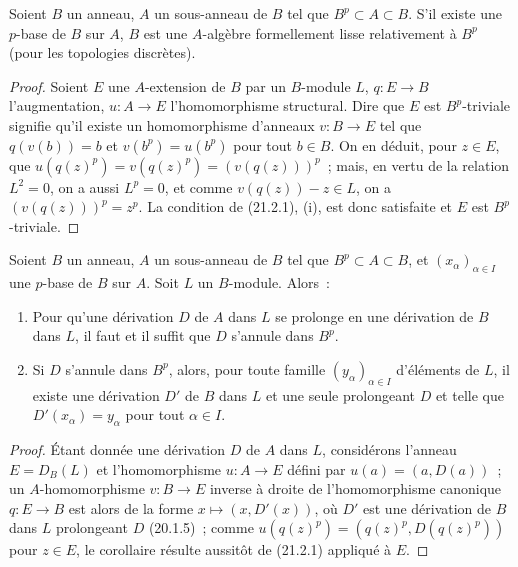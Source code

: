 \begin{corollary}[21.2.2]
\label{0.21.2.2-fr}
Soient $B$ un anneau, $A$ un sous-anneau de $B$ tel que $B^p\subset A\subset B$.
S'il existe une $p$-base de $B$ sur $A$, $B$ est une $A$-algèbre formellement
lisse relativement à $B^p$ (pour les topologies discrètes).
\end{corollary}

\begin{proof}
Soient $E$ une $A$-extension de $B$ par un $B$-module $L$, $q:E\to B$
l'augmentation, $u:A\to E$ l'homomorphisme structural. Dire que $E$ est
$B^p$-triviale signifie qu'il existe un homomorphisme d'anneaux $v:B\to E$
tel que $q(v(b))=b$ et $v(b^p)=u(b^p)$ pour tout $b\in B$. On en déduit,
pour $z\in E$, que $u(q(z)^p)=v(q(z)^p)=(v(q(z)))^p$~; mais, en vertu de
la relation $L^2=0$, on a aussi $L^p=0$, et comme $v(q(z))-z\in L$, on a
$(v(q(z)))^p=z^p$. La condition de (21.2.1), (i), est donc satisfaite et
$E$ est $B^p$-triviale.
\end{proof}

\begin{corollary}[21.2.3]
\label{0.21.2.3-fr}
Soient $B$ un anneau, $A$ un sous-anneau de $B$ tel que $B^p\subset A\subset B$,
et $\left(x_\alpha\right)_{\alpha\in I}$ une $p$-base de $B$ sur $A$. Soit
$L$ un $B$-module. Alors~:
\begin{enumerate}
  \item[(i)] Pour qu'une dérivation $D$ de $A$ dans $L$ se prolonge en une
  dérivation de $B$ dans $L$, il faut et il suffit que $D$ s'annule dans $B^p$.
  \item[(ii)] Si $D$ s'annule dans $B^p$, alors, pour toute famille
  $(y_\alpha)_{\alpha\in I}$ d'éléments de $L$, il existe une dérivation
  $D'$ de $B$ dans $L$ et une seule prolongeant $D$ et telle que
  $D'(x_\alpha)=y_\alpha$ pour tout $\alpha\in I$.
\end{enumerate}
\end{corollary}

\begin{proof}
Étant donnée une dérivation $D$ de $A$ dans $L$, considérons l'anneau
$E=D_B(L)$ et l'homomorphisme $u:A\to E$ défini par $u(a)=(a,D(a))$~; un
$A$-homomorphisme $v:B\to E$ inverse à droite de l'homomorphisme canonique
$q:E\to B$ est alors de la forme $x\mapsto(x,D'(x))$, où $D'$ est une
dérivation de $B$ dans $L$ prolongeant $D$ (20.1.5)~; comme
$u(q(z)^p)=(q(z)^p,D(q(z)^p))$ pour $z\in E$, le corollaire résulte aussitôt
de (21.2.1) appliqué à $E$.
\end{proof}

